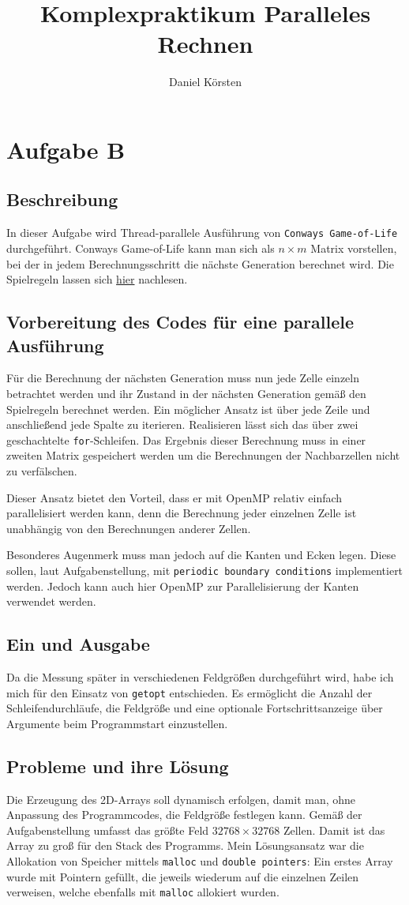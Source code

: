 \documentclass[german,plainarticle,hyperref,utf8]{zihpub}
\author{Daniel Körsten}
\title{Komplexpraktikum Paralleles Rechnen}
\begin{document}
	\section{Aufgabe B}
	\subsection{Beschreibung}
	In dieser Aufgabe wird Thread-parallele Ausführung von \verb|Conways Game-of-Life| durchgeführt. Conways Game-of-Life kann man sich als $n\times m$ Matrix vorstellen, bei der in jedem Berechnungsschritt die nächste Generation berechnet wird. Die Spielregeln lassen sich \href{https://de.wikipedia.org/wiki/Conways_Spiel_des_Lebens#Die_Spielregeln}{hier} nachlesen.
	
	\subsection{Vorbereitung des Codes für eine parallele Ausführung}
	Für die Berechnung der nächsten Generation muss nun jede Zelle einzeln betrachtet werden und ihr Zustand in der nächsten Generation gemäß den Spielregeln berechnet werden.
	Ein möglicher Ansatz ist über jede Zeile und anschließend jede Spalte zu iterieren. Realisieren lässt sich das über zwei geschachtelte \verb|for|-Schleifen. Das Ergebnis dieser Berechnung muss in einer zweiten Matrix gespeichert werden um die Berechnungen der Nachbarzellen nicht zu verfälschen.
	
	Dieser Ansatz bietet den Vorteil, dass er mit OpenMP relativ einfach parallelisiert werden kann, denn die Berechnung jeder einzelnen Zelle ist unabhängig von den Berechnungen anderer Zellen.
	
	Besonderes Augenmerk muss man jedoch auf die Kanten und Ecken legen. Diese sollen, laut Aufgabenstellung, mit \verb|periodic boundary conditions| implementiert werden. Jedoch kann auch hier OpenMP zur Parallelisierung der Kanten verwendet werden.

	\subsection{Ein und Ausgabe}
	Da die Messung später in verschiedenen Feldgrößen durchgeführt wird, habe ich mich für den Einsatz von \verb|getopt| entschieden. Es ermöglicht die Anzahl der Schleifendurchläufe, die Feldgröße und eine optionale Fortschrittsanzeige über Argumente beim Programmstart einzustellen.
	
	\subsection{Probleme und ihre Lösung}
	Die Erzeugung des 2D-Arrays soll dynamisch erfolgen, damit man, ohne Anpassung des Programmcodes, die Feldgröße festlegen kann. Gemäß der Aufgabenstellung umfasst das größte Feld $32768\times 32768$ Zellen. Damit ist das Array zu groß für den Stack des Programms.
	Mein Lösungsansatz war die Allokation von Speicher mittels \verb|malloc| und \verb|double pointers|: Ein erstes Array wurde mit Pointern gefüllt, die jeweils wiederum auf die einzelnen Zeilen verweisen, welche ebenfalls mit \verb|malloc| allokiert wurden.
	
\end{document}
